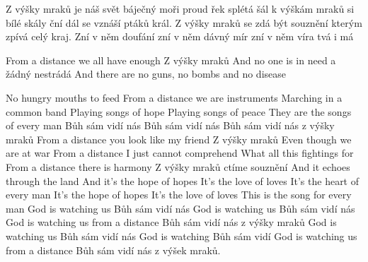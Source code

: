 Z výšky mraků je náš svět báječný
moři proud řek splétá šál
k výškám mraků si bílé skály ční 
dál se vznáší ptáků král.
Z výšky mraků se zdá být souznění
kterým zpívá celý kraj.
Zní v něm doufání
zní v něm dávný mír
zní v něm víra tvá i má

From a distance we all have enough
Z výšky mraků
And no one is in need
a žádný nestrádá
And there are no guns, no bombs and no disease

No hungry mouths to feed
From a distance we are instruments
Marching in a common band
Playing songs of hope
Playing songs of peace
They are the songs of every man
Bůh sám vidí nás
Bůh sám vidí nás
Bůh sám vidí nás z výšky mraků
From a distance you look like my friend
Z výšky mraků
Even though we are at war
From a distance I just cannot comprehend
What all this fightings for
From a distance there is harmony
Z výšky mraků ctíme souznění
And it echoes through the land
And it's the hope of hopes
It's the love of loves
It's the heart of every man
It's the hope of hopes
It's the love of loves
This is the song for every man
God is watching us
Bůh sám vidí nás
God is watching us
Bůh sám vidí nás
God is watching us from a distance
Bůh sám vidí nás z výšky mraků
God is watching us
Bůh sám vidí nás
God is watching
Bůh sám vidí
God is watching us from a distance
Bůh sám vidí nás z výšek mraků.
